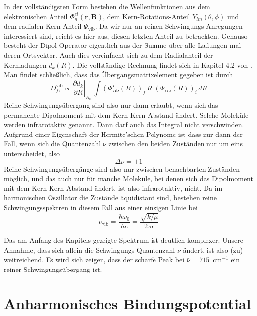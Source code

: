 In der vollständigsten Form bestehen die Wellenfunktionen aus dem elektronischen Anteil $ \Phi_n^{el}  (\mathbf{r}, \mathbf{R})  $, dem Kern-Rotations-Anteil $ Y_{l m} (\theta, \phi)$ und dem radialen Kern-Anteil  $\Psi_\text{vib}$. Da wir nur an reinen Schwingungs-Anregungen interessiert sind, reicht es hier aus, diesen letzten Anteil zu betrachten. Genauso besteht der Dipol-Operator eigentlich aus der Summe über alle Ladungen mal deren Ortsvektor. Auch dies vereinfacht sich zu dem Radialanteil der Kernladungen $d_k(R)$. Die vollständige Rechnung findet sich in Kapitel 4.2 von \cite{Demtröder_molekuelphysik}. Man findet schließlich, dass das Übergangsmatrixelement gegeben ist durch
\begin{equation}
D_{fi}^\text{vib} \propto  \left. \frac{\partial d_k}{\partial R} \right|_{R_0} \,  \int (\Psi_\text{vib}^\star (R) )_f \, R  \, \, (\Psi_\text{vib} (R) )_i \, dR
\end{equation}
Reine Schwingungsübergang sind also nur dann erlaubt, wenn sich das permanente Dipolmoment mit dem Kern-Kern-Abstand ändert. Solche Moleküle werden infrarotaktiv genannt. Dann  darf auch das Integral nicht verschwinden. Aufgrund einer Eigenschaft der Hermite'schen Polynome ist dass nur dann der Fall, wenn sich die Quantenzahl $\nu$ zwischen den beiden Zuständen nur um eins unterscheidet, also 
\begin{equation}
 \Delta \nu = \pm 1
\end{equation}
Reine Schwingungsübergänge sind also nur zwischen benachbarten Zuständen möglich, und das auch nur für manche Moleküle, bei denen sich das Dipolmoment mit dem Kern-Kern-Abstand ändert.  ist also infrarotaktiv,  nicht. Da im harmonischen Oszillator die Zustände äquidistant sind, bestehen reine Schwingungsspektren in diesem Fall aus einer einzigen Linie bei 
\begin{equation}
 \bar{\nu}_\text{vib} = \frac{\hbar \omega_0}{h c} = \frac{\sqrt{k / \mu} }{2 \pi  c}
\end{equation}

Das am Anfang des Kapitels gezeigte Spektrum ist deutlich komplexer. Unsere Annahme, dass sich allein die Schwingungs-Quantenzahl $\nu$ ändert, ist also (zu) weitreichend. Es wird sich zeigen, dass der scharfe Peak bei $\bar{\nu} = 715$~cm$^{-1}$ ein reiner Schwingungsübergang ist.

\section{Anharmonisches Bindungspotential}

